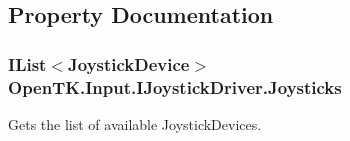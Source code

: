 \subsection{Property Documentation}
\hypertarget{interface_open_t_k_1_1_input_1_1_i_joystick_driver_abcc28b1127554a446e37bed7d62e5024}{
\subsubsection[{Joysticks}]{\setlength{\rightskip}{0pt plus 5cm}I\-List$<${\bf Joystick\-Device}$>$ Open\-T\-K.\-Input.\-I\-Joystick\-Driver.\-Joysticks\hspace{0.3cm}{\ttfamily [get]}}}\label{interface_open_t_k_1_1_input_1_1_i_joystick_driver_abcc28b1127554a446e37bed7d62e5024}


Gets the list of available Joystick\-Devices. 

